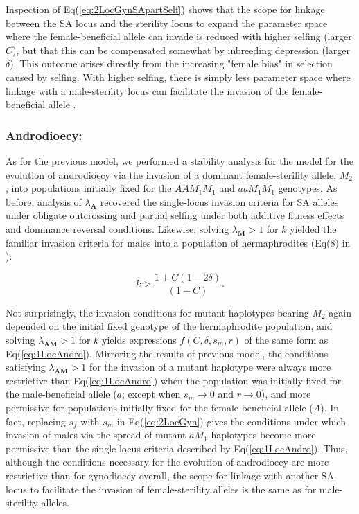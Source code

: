 \documentclass[9pt,twocolumn,twoside,lineno]{gsajnl}
\begin{document}
\noindent Inspection of Eq(\ref{eq:2LocGynSApartSelf}) shows that the scope for linkage between the SA locus and the sterility locus to expand the parameter space where the female-beneficial allele can invade is reduced with higher selfing (larger $C$), but that this can be compensated somewhat by inbreeding depression (larger $\delta$). This outcome arises directly from the increasing "female bias" in selection caused by selfing. With higher selfing, there is simply less parameter space where linkage with a male-sterility locus can facilitate the invasion of the female-beneficial allele \citep{JordanConnallon2014,Olito2017}.

\subsubsection{Androdioecy:} As for the previous model, we performed a stability analysis for the model for the evolution of androdioecy via the invasion of a dominant female-sterility allele, $M_2$, into populations initially fixed for the $AAM_1M_1$ and $aaM_1M_1$ genotypes. As before, analysis of $\lambda_{\mathbf{A}}$ recovered the single-locus invasion criteria for SA alleles under obligate outcrossing and partial selfing under both additive fitness effects and dominance reversal conditions. Likewise, solving $\lambda_{\mathbf{M}} > 1$ for $k$ yielded the familiar invasion criteria for males into a population of hermaphrodites (Eq(8) in \citealt{Charlesworth1978a}):

\begin{equation}\label{eq:1LocAndro}
	\hat{k} > \frac{1 + C (1 - 2 \delta)}{(1 - C)}.
\end{equation}

\noindent Not surprisingly, the invasion conditions for mutant haplotypes bearing $M_2$ again depended on the initial fixed genotype of the hermaphrodite population, and solving $\lambda_{\mathbf{AM}} > 1$ for $k$ yields expressions $f(C,\delta,s_m,r)$ of the same form as Eq(\ref{eq:1LocAndro}). Mirroring the results of previous model, the conditions satisfying $\lambda_{\mathbf{AM}} > 1$ for the invasion of a mutant haplotype were always more restrictive than Eq(\ref{eq:1LocAndro}) when the population was initially fixed for the male-beneficial allele ($a$; except when $s_m \rightarrow 0$ and $r \rightarrow 0$), and more permissive for populations initially fixed for the female-beneficial allele ($A$). In fact, replacing $s_f$ with $s_m$ in Eq(\ref{eq:2LocGyn}) gives the conditions under which invasion of males via the spread of mutant $aM_1$ haplotypes become more permissive than the single locus criteria described by Eq(\ref{eq:1LocAndro}). Thus, although the conditions necessary for the evolution of androdioecy are more restrictive than for gynodioecy overall, the scope for linkage with another SA locus to facilitate the invasion of female-sterility alleles is the same as for male-sterility alleles. 
\end{document}
